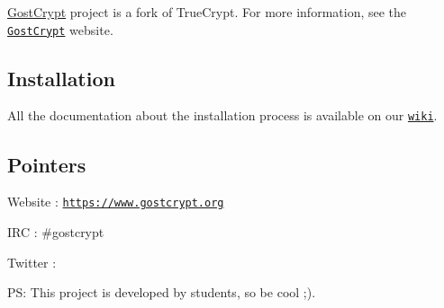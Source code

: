 \hyperlink{namespace_gost_crypt}{Gost\+Crypt} project is a fork of True\+Crypt. For more information, see the \href{https://www.gostcrypt.org/}{\tt Gost\+Crypt} website.

\subsection*{Installation}

All the documentation about the installation process is available on our \href{https://www.gostcrypt.org/wiki/doku.php}{\tt wiki}.

\subsection*{Pointers}

Website \+: \href{https://www.gostcrypt.org}{\tt https\+://www.\+gostcrypt.\+org}

I\+RC \+: \#gostcrypt

Twitter \+: 

PS\+: This project is developed by students, so be cool ;). 